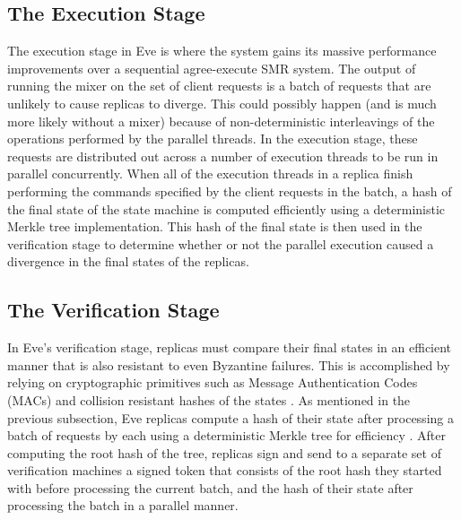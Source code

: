 \documentclass[11pt, oneside]{report}
\begin{document}
\subsection{The Execution Stage}\label{EveExecution}

The execution stage in Eve is where the system gains its massive performance improvements over a sequential agree-execute SMR system. 
The output of running the mixer on the set of client requests is a batch of requests that are unlikely to cause replicas to diverge. 
This could possibly happen (and is much more likely without a mixer) because of non-deterministic interleavings of the operations performed by the parallel threads.
In the execution stage, these requests are distributed out across a number of execution threads to be run in parallel concurrently. 
When all of the execution threads in a replica finish performing the commands specified by the client requests in the batch, a hash of the final state of the state machine is computed efficiently using a deterministic Merkle tree implementation. 
This hash of the final state is then used in the verification stage to determine whether or not the parallel execution caused a divergence in the final states of the replicas.

\subsection{The Verification Stage}\label{EveVerification}
In Eve's verification stage, replicas must compare their final states in an efficient manner that is also resistant to even Byzantine failures. 
This is accomplished by relying on cryptographic primitives such as Message Authentication Codes (MACs) and collision resistant hashes of the states \cite{eve}. 
As mentioned in the previous subsection, Eve replicas compute a hash of their state after processing a batch of requests by each using a deterministic Merkle tree for efficiency \cite{eve}. 
After computing the root hash of the tree, replicas sign and send to a separate set of verification machines a signed token that consists of the root hash they started with before processing the current batch, and the hash of their state after processing the batch in a parallel manner.
\end{document}
